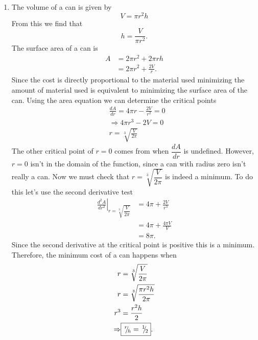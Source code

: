 \documentclass{hwset}
\begin{document}
\begin{enumerate}
  \item \begin{solution}
    The volume of a can is given by
    \begin{equation}
      V = \pi r^2 h
      \label{eqn:CanVol}
    \end{equation}
    From this we find that 
    \begin{equation}
      h = \dfrac{V}{\pi r^2}. 
      \label{eqn:RtoH}
    \end{equation}
    The surface area of a can is
    \begin{align*}
      A &= 2\pi r^2 + 2\pi r h \\
      &= 2\pi r^2 + \frac{2V}{r} .
    \end{align*}
    Since the cost is directly proportional to the material used minimizing the
    amount of material used is equivalent to minimizing the surface area of the
    can. Using the area equation we can determine the critical points
    \begin{align*}
      &\frac{dA}{dr} = 4\pi r - \frac{2V}{r^2} = 0\\
      &\Rightarrow 4\pi r^3 - 2V = 0 \\ 
      &r = \sqrt[3]{\frac{V}{2\pi}} 
    \end{align*}
    The other critical point of $r=0$ comes from when $\dfrac{dA}{dr}$ is
    undefined. However, $r=0$ isn't in the domain of the function, since a can
    with radius zero isn't really a can. Now we must check that
    $r=\sqrt[3]{\dfrac{V}{2\pi}}$ is indeed a minimum. To do this let's use the
    second derivative test
    \begin{align*}
      \left.\frac{d^2A}{dr^2}\right|_{r=\sqrt[3]{\dfrac{V}{2\pi}}} &= 4\pi + \frac{2V}{r^3} \\
      &= 4\pi + \frac{4\pi V}{V} \\
      &= 8\pi.
    \end{align*}
    Since the second derivative at the critical point is positive this is a
    minimum. Therefore, the minimum cost of a can happens when
    \begin{align*}
      r &= \sqrt[3]{\frac{V}{2\pi}} \\
      r &= \sqrt[3]{\frac{\pi r^2 h}{2\pi}} \\
      r^3 &= \frac{r^2 h}{2} \\
      \Rightarrow& \boxed{\,^{r}\!\!/\!_{h}=\,^{1}\!\!/\!_{2}}.
    \end{align*}
  \end{solution}

\end{enumerate}
\end{document}
